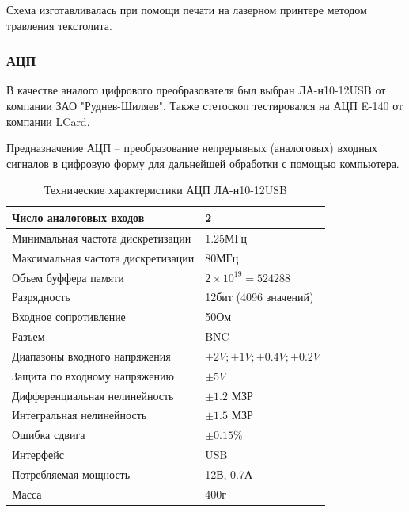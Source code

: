 Схема изготавливалась при помощи печати на лазерном принтере методом травления текстолита. 
\subsubsection{АЦП}
В качестве аналого цифрового преобразователя был выбран ЛА-н10-12USB от компании ЗАО "Руднев-Шиляев". Также стетоскоп тестировался на АЦП E-140 от компании LCard. 

Предназначение АЦП – преобразование непрерывных (аналоговых) входных сигналов в цифровую форму для дальнейшей обработки с помощью компьютера.

\begin{table}[h]
\centering
\label{my-label}
\begin{tabular}{|l|l|}
                                                                      \hline
Число аналоговых входов            & 2                             \\ \hline
Минимальная частота дискретизации  & 1.25МГц                       \\ \hline
Максимальная частота дискретизации & 80МГц                         \\ \hline
Объем буффера памяти               & $2\times10^{19}=524288$       \\ \hline
Разрядность                        & 12бит (4096 значений)         \\ \hline
Входное сопротивление              & 50Ом                          \\ \hline
Разъем                             & BNC                           \\ \hline
Диапазоны входного напряжения      & $\pm2V;\pm1V;\pm0.4V;\pm0.2V$ \\ \hline
Защита по входному напряжению      & $\pm5V$                       \\ \hline
Дифференциальная нелинейность      & $\pm1.2$ МЗР                  \\ \hline
Интегральная нелинейность          & $\pm1.5$ МЗР                  \\ \hline
Ошибка сдвига                      & $\pm0.15\%$                   \\ \hline
Интерфейс                          & USB                           \\ \hline
Потребляемая мощность              & 12В, 0.7А                     \\ \hline
Масса                              & 400г                          \\ \hline
\end{tabular}
\caption{Технические характеристики АЦП ЛА-н10-12USB}
\end{table}

